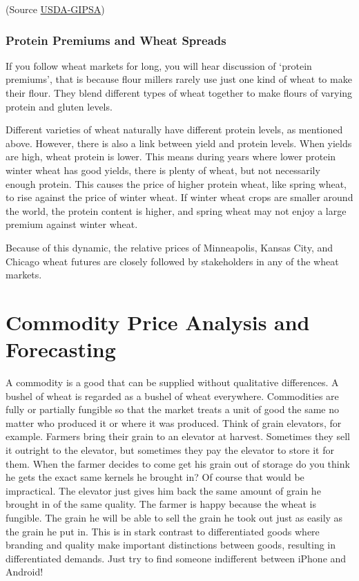 \documentclass[]{book}
\theoremstyle{definition}
\theoremstyle{definition}
\theoremstyle{remark}
\begin{document}
(Source
\href{https://www.gipsa.usda.gov/fgis/commgallery/gr_srw.aspx}{USDA-GIPSA})

\subsection{Protein Premiums and Wheat
Spreads}\label{protein-premiums-and-wheat-spreads}

If you follow wheat markets for long, you will hear discussion of
`protein premiums', that is because flour millers rarely use just one
kind of wheat to make their flour. They blend different types of wheat
together to make flours of varying protein and gluten levels.

Different varieties of wheat naturally have different protein levels, as
mentioned above. However, there is also a link between yield and protein
levels. When yields are high, wheat protein is lower. This means during
years where lower protein winter wheat has good yields, there is plenty
of wheat, but not necessarily enough protein. This causes the price of
higher protein wheat, like spring wheat, to rise against the price of
winter wheat. If winter wheat crops are smaller around the world, the
protein content is higher, and spring wheat may not enjoy a large
premium against winter wheat.

Because of this dynamic, the relative prices of Minneapolis, Kansas
City, and Chicago wheat futures are closely followed by stakeholders in
any of the wheat markets.

\chapter{Commodity Price Analysis and
Forecasting}\label{commodity-price-analysis-and-forecasting}

A commodity is a good that can be supplied without qualitative
differences. A bushel of wheat is regarded as a bushel of wheat
everywhere. Commodities are fully or partially fungible so that the
market treats a unit of good the same no matter who produced it or where
it was produced. Think of grain elevators, for example. Farmers bring
their grain to an elevator at harvest. Sometimes they sell it outright
to the elevator, but sometimes they pay the elevator to store it for
them. When the farmer decides to come get his grain out of storage do
you think he gets the exact same kernels he brought in? Of course that
would be impractical. The elevator just gives him back the same amount
of grain he brought in of the same quality. The farmer is happy because
the wheat is fungible. The grain he will be able to sell the grain he
took out just as easily as the grain he put in. This is in stark
contrast to differentiated goods where branding and quality make
important distinctions between goods, resulting in differentiated
demands. Just try to find someone indifferent between iPhone and
Android!
\end{document}
